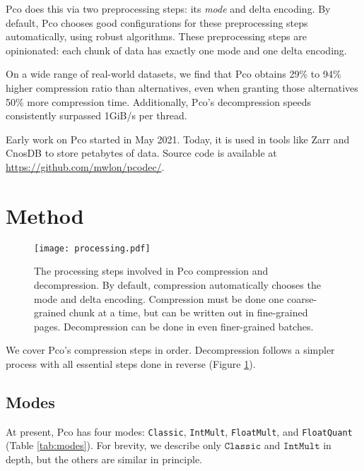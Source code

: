 \documentclass[letterpaper]{article}
\begin{document}
Pco does this via two preprocessing steps: its \emph{mode} and delta encoding.
By default, Pco chooses good configurations for these preprocessing steps automatically, using robust algorithms.
These preprocessing steps are opinionated: each chunk of data has exactly one mode and one delta encoding.

On a wide range of real-world datasets, we find that Pco obtains 29\% to 94\% higher compression ratio than alternatives, even when granting those alternatives 50\% more compression time.
Additionally, Pco's decompression speeds consistently surpassed 1GiB/s per thread.

Early work on Pco started in May 2021.
Today, it is used in tools like Zarr \cite{zarr} and CnosDB \cite{cnosdb} to store petabytes of data.
Source code is available at \url{https://github.com/mwlon/pcodec/}.

\section{Method}

\begin{figure}
\begin{center}
\texttt{[image: processing.pdf]}
\end{center}
\caption{
The processing steps involved in Pco compression and decompression.
By default, compression automatically chooses the mode and delta encoding.
Compression must be done one coarse-grained chunk at a time, but can be written out in fine-grained pages.
Decompression can be done in even finer-grained batches.
}
\label{fig:processing}
\end{figure}

We cover Pco's compression steps in order.
Decompression follows a simpler process with all essential steps done in reverse (Figure \ref{fig:processing}).

\subsection{Modes}

At present, Pco has four modes: \texttt{Classic}, \texttt{IntMult}, \texttt{FloatMult}, and \texttt{FloatQuant} (Table \ref{tab:modes}).
For brevity, we describe only $\texttt{Classic}$ and $\texttt{IntMult}$ in depth, but the others are similar in principle.
\end{document}
